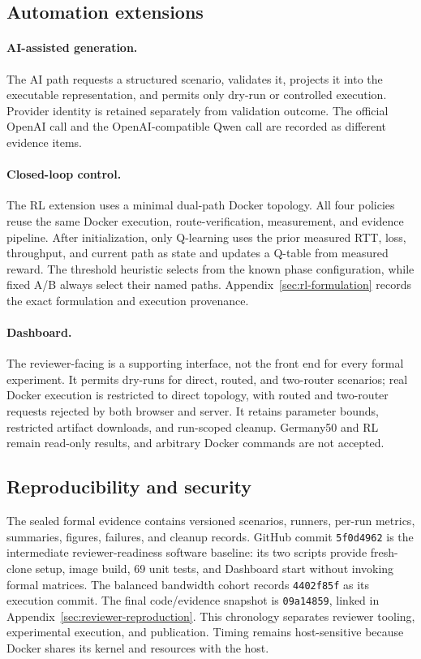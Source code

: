 \subsection{Automation extensions}

\paragraph{AI-assisted generation.} The AI path requests a structured scenario, validates it, projects it into the executable representation, and permits only dry-run or controlled execution. Provider identity is retained separately from validation outcome. The official OpenAI call and the OpenAI-compatible Qwen call are recorded as different evidence items.

\paragraph{Closed-loop control.} The RL extension uses a minimal dual-path Docker topology. All four policies reuse the same Docker execution, route-verification, measurement, and evidence pipeline. After initialization, only Q-learning uses the prior measured RTT, loss, throughput, and current path as state and updates a Q-table from measured reward. The threshold heuristic selects from the known phase configuration, while fixed A/B always select their named paths. Appendix~\ref{sec:rl-formulation} records the exact formulation and execution provenance.

\paragraph{Dashboard.} The reviewer-facing  is a supporting interface, not the front end for every formal experiment. It permits dry-runs for direct, routed, and two-router scenarios; real Docker execution is restricted to direct topology, with routed and two-router requests rejected by both browser and server. It retains parameter bounds, restricted artifact downloads, and run-scoped cleanup. Germany50 and RL remain read-only results, and arbitrary Docker commands are not accepted.

\subsection{Reproducibility and security}

The sealed formal evidence contains versioned scenarios, runners, per-run metrics, summaries, figures, failures, and cleanup records. GitHub commit \texttt{5f0d4962} is the intermediate reviewer-readiness software baseline: its two scripts provide fresh-clone setup, image build, 69 unit tests, and Dashboard start without invoking formal matrices. The balanced bandwidth cohort records \texttt{4402f85f} as its execution commit. The final code/evidence snapshot is \texttt{09a14859}, linked in Appendix~\ref{sec:reviewer-reproduction}. This chronology separates reviewer tooling, experimental execution, and publication. Timing remains host-sensitive because Docker shares its kernel and resources with the host.
